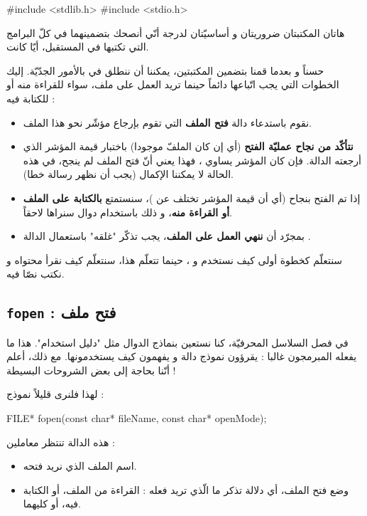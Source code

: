 \begin{Csource}
#include <stdlib.h>
#include <stdio.h>
\end{Csource}

هاتان المكتبتان ضروريتان و أساسيّتان لدرجة أنّي أنصحك بتضمينهما في كلّ البرامج التي تكتبها في المستقبل، أيّا كانت.

حسناً و بعدما قمنا بتضمين المكتبتين، يمكننا أن ننطلق في بالأمور الجدّيّة. إليك الخطوات التي يجب اتّباعها دائماً حينما تريد العمل على ملف، سواء للقراءة منه أو للكتابة فيه :

\begin{itemize}
  \item نقوم باستدعاء دالة
\textbf{فتح الملف}
التي تقوم بإرجاع مؤشّر نحو هذا الملف.
  \item \textbf{نتأكّد من نجاح عمليّة الفتح}
(أي إن كان الملفّ موجودا) باختبار قيمة المؤشر الذي أرجعته الدالة. فإن كان المؤشر يساوي
،
فهذا يعني أنّ فتح الملف لم ينجح، في هذه الحالة لا يمكننا الإكمال (يجب أن نظهر رسالة خطا).
  \item إذا تم الفتح بنجاح (أي أن قيمة المؤشر تختلف عن
)،
سنستمتع
\textbf{بالكتابة على الملف أو القراءة منه}،
و ذلك باستخدام دوال سنراها لاحقاً.
  \item بمجرّد أن
\textbf{ننهي العمل على الملف}،
يجب تذكّر "غلقه" باستعمال الدالة
.
\end{itemize}

سنتعلّم كخطوة أولى كيف نستخدم
و
،
حينما تتعلّم هذا، سنتعلّم كيف نقرأ محتواه و نكتب نصّا فيه.

\subsection{\texttt{fopen} : فتح ملف}

في فصل السلاسل المحرفيّة، كنا نستعين بنماذج الدوال مثل "دليل استخدام". هذا ما يفعله المبرمجون غالبا : يقرؤون نموذج دالة و يفهمون كيف يستخدمونها. مع ذلك، أعلم أنّنا بحاجة إلى بعض الشروحات البسيطة !

لهذا فلنرى قليلاً نموذج
 :

\begin{Csource}
FILE* fopen(const char* fileName, const char* openMode);
\end{Csource}

هذه الدالة تنتظر معاملين :

\begin{itemize}
  \item اسم الملف الذي نريد فتحه.
  \item وضع فتح الملف، أي دلالة تذكر ما الّذي تريد فعله : القراءة من الملف، أو الكتابة فيه، أو كليهما.
\end{itemize}

